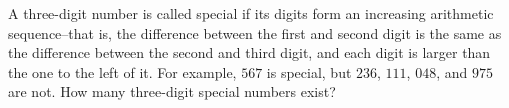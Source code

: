 A three-digit number is called special if its digits form an increasing arithmetic sequence--that is, the difference between the first and second digit is the same as the difference between the second and third digit, and each digit is larger than the one to the left of it. For example, $567$ is special, but $236$, $111$, $048$, and $975$ are not. How many three-digit special numbers exist?
